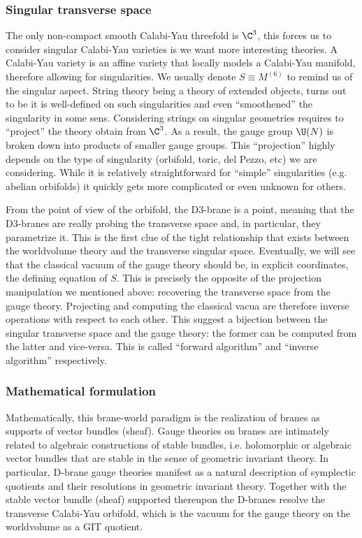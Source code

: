 \documentclass{worksheetclass}
\begin{document}
    \subsubsection*{Singular transverse space}

        The only non-compact smooth Calabi-Yau threefold is $\C^3$, this forces us to consider singular Calabi-Yau varieties is we want more interesting theories. A Calabi-Yau variety is an affine variety that locally models a Calabi-Yau manifold, therefore allowing for singularities. We usually denote $S\equiv M^{(6)}$ to remind us of the singular aspect. String theory being a theory of extended objects, turns out to be it is well-defined on such singularities and even ``smoothened'' the singularity in some sens. Considering strings on singular geometries requires to ``project'' the theory obtain from $\C^3$. As a result, the gauge group $\U(N)$ is broken down into products of smaller gauge groups. This ``projection'' highly depends on the type of singularity (orbifold, toric, del Pezzo, etc) we are considering. While it is relatively straightforward for ``simple'' singularities (e.g. abelian orbifolds) it quickly gets more complicated or even unknown for others.
    
        From the point of view of the orbifold, the D$3$-brane is a point, meaning that the D$3$-branes are really probing the transverse space and, in particular, they parametrize it. This is the first clue of the tight relationship that exists between the worldvolume theory and the transverse singular space. Eventually, we will see that the classical vacuum of the gauge theory should be, in explicit coordinates, the defining equation of $S$. This is precisely the opposite of the projection manipulation we mentioned above: recovering the transverse space from the gauge theory. Projecting and computing the classical vacua are therefore inverse operations with respect to each other. This suggest a bijection between the singular transverse space and the gauge theory: the former can be computed from the latter and vice-versa. This is called ``forward algorithm'' and ``inverse algorithm'' respectively.

    \subsubsection*{Mathematical formulation}

        Mathematically, this brane-world paradigm is the realization of branes as supports of vector bundles (sheaf). Gauge theories on branes are intimately related to algebraic constructions of stable bundles, i.e. holomorphic or algebraic vector bundles that are stable in the sense of geometric invariant theory. In particular, D-brane gauge theories manifest as a natural description of symplectic quotients and their resolutions in geometric invariant theory. Together with the stable vector bundle (sheaf) supported thereupon the D-branes resolve the transverse Calabi-Yau orbifold, which is the vacuum for the gauge theory on the worldvolume as a GIT quotient.
\end{document}
